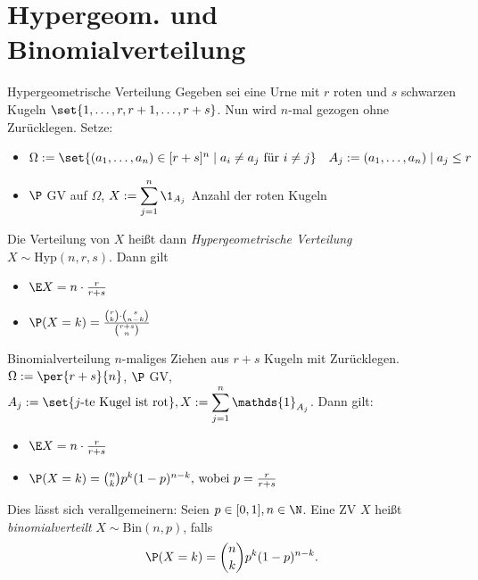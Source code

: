 \section*{Hypergeom. und Binomialverteilung}
 \begin{karte}{Hypergeometrische Verteilung}
 	Gegeben sei eine Urne mit $r$ roten und $s$ schwarzen Kugeln $\set{1,\dotsc,r,r+1,\dotsc,r+s}$. Nun wird $n$-mal gezogen ohne Zurücklegen. Setze:
 	\begin{itemize}
 		\item $\Omega := \set{(a_1,\dotsc,a_n) \in [r+s]^n \;|\; a_i \neq a_j \text{ für } i \neq j} \quad A_j := {(a_1,\dotsc,a_n) \;|\; a_j \leq r}$
 		\item $\P$ GV auf $\Omega$, $\displaystyle X:= \sum_{j=1}^{n} \1_{A_j}$ Anzahl der roten Kugeln
 	\end{itemize}
 	Die Verteilung von $X$ heißt dann \textit{Hypergeometrische Verteilung} $X \sim \text{Hyp}(n,r,s)$. Dann gilt
 	\begin{itemize}
 		\item $\E X = n \cdot \frac{r}{r+s}$
 		\item $\P(X=k) = \frac{\binom{r}{k} \cdot \binom{s}{n-k}}{\binom{r+s}{n}}$
 	\end{itemize}
 \end{karte}

\begin{karte}{Binomialverteilung}
	$n$-maliges Ziehen aus $r+s$ Kugeln mit Zurücklegen. $\Omega := \per{r+s}{n}$, $\P$ GV, $A_j:=\set{j\text{-te Kugel ist rot}}, \displaystyle X := \sum_{j=1}^{n} \mathds{1}_{A_j} $. Dann gilt:
	\begin{itemize}
		\item $\E X = n \cdot \frac{r}{r+s}$
		\item $\P(X=k)=\binom{n}{k}p^k(1-p)^{n-k} \text{, wobei } p = \frac{r}{r+s}$ 
	\end{itemize}
	Dies lässt sich verallgemeinern: Seien $p \in [0,1], n \in \N$. Eine ZV $X$ heißt \textit{binomialverteilt} $X \sim \text{Bin}(n,p)$, falls  $$\P(X=k)=\binom{n}{k}p^k(1-p)^{n-k} \text{.}$$
\end{karte}